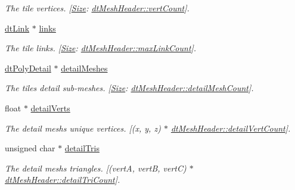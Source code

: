 \begin{DoxyCompactItemize}
\begin{DoxyCompactList}\small\item\em The tile vertices. \mbox{[}\hyperlink{classSize}{Size}\+: \hyperlink{structdtMeshHeader_aad331f09586b0959eeb0826152315b92}{dt\+Mesh\+Header\+::vert\+Count}\mbox{]}. \end{DoxyCompactList}\item 
\mbox{\label{structdtMeshTile_ae1a63b635908d1db5533e2108dcb5b8f}} 
\hyperlink{structdtLink}{dt\+Link} $\ast$ \hyperlink{structdtMeshTile_ae1a63b635908d1db5533e2108dcb5b8f}{links}
\begin{DoxyCompactList}\small\item\em The tile links. \mbox{[}\hyperlink{classSize}{Size}\+: \hyperlink{structdtMeshHeader_ab9f95d40e21c8710f59e78ef89ce1cc0}{dt\+Mesh\+Header\+::max\+Link\+Count}\mbox{]}. \end{DoxyCompactList}\item 
\mbox{\label{structdtMeshTile_a6dd91d6195ed659898c2a9f43622186d}} 
\hyperlink{structdtPolyDetail}{dt\+Poly\+Detail} $\ast$ \hyperlink{structdtMeshTile_a6dd91d6195ed659898c2a9f43622186d}{detail\+Meshes}
\begin{DoxyCompactList}\small\item\em The tile\textquotesingle{}s detail sub-\/meshes. \mbox{[}\hyperlink{classSize}{Size}\+: \hyperlink{structdtMeshHeader_a79ce7145dd4854c55cd94d5c57faf392}{dt\+Mesh\+Header\+::detail\+Mesh\+Count}\mbox{]}. \end{DoxyCompactList}\item 
\mbox{\label{structdtMeshTile_a916cb93915400b3a0edabe9c2206c670}} 
float $\ast$ \hyperlink{structdtMeshTile_a916cb93915400b3a0edabe9c2206c670}{detail\+Verts}
\begin{DoxyCompactList}\small\item\em The detail mesh\textquotesingle{}s unique vertices. \mbox{[}(x, y, z) $\ast$ \hyperlink{structdtMeshHeader_abe1c10b7e925b0b31adf72f8f2d1d7e9}{dt\+Mesh\+Header\+::detail\+Vert\+Count}\mbox{]}. \end{DoxyCompactList}\item 
\mbox{\label{structdtMeshTile_ad32d72c505505031c56f3d3507dede17}} 
unsigned char $\ast$ \hyperlink{structdtMeshTile_ad32d72c505505031c56f3d3507dede17}{detail\+Tris}
\begin{DoxyCompactList}\small\item\em The detail mesh\textquotesingle{}s triangles. \mbox{[}(vertA, vertB, vertC) $\ast$ \hyperlink{structdtMeshHeader_a008cebda05907508cf862d18945d8459}{dt\+Mesh\+Header\+::detail\+Tri\+Count}\mbox{]}. \end{DoxyCompactList}\item 

\end{DoxyCompactItemize}

